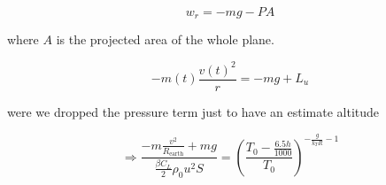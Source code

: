 \documentclass{article}
\begin{document}
\begin{equation}
    w_r=-mg -PA 
\end{equation}

where $A$ is the projected area of the whole plane.

\begin{equation}
    -m(t)\frac{v(t)^2}{r}=-mg+ L_u
\end{equation}

were we dropped the pressure term just to have an estimate altitude

\begin{equation}
  \Rightarrow \frac{-m\frac{v^2}{R_{\text{earth}}} +mg}{\frac{\beta C_L}{2} \rho_0 u^2S}=  \left(\frac{T_0-\frac{6.5h}{1000}}{T_0}\right)^{-\frac{g}{k_TR}-1}    
\end{equation}

\printbibliography
\end{document}
